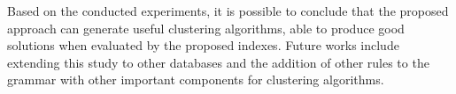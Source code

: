 \documentclass[conference]{IEEEtran}
\begin{document}
	Based on the conducted experiments, it is possible to conclude that the proposed approach can generate useful clustering algorithms, able to produce good solutions when evaluated by the proposed indexes. Future works include extending this study to other databases and the addition of other rules to the grammar with other important components for clustering algorithms.
	
	
	
	
	
\end{document}
